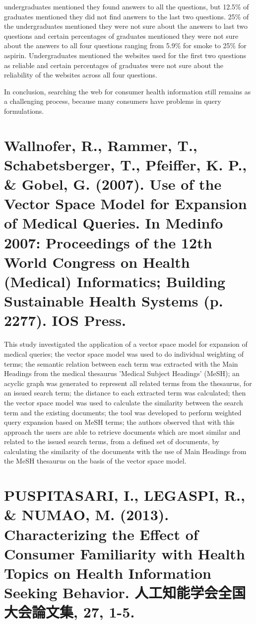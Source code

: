 \documentclass[]{article}
\begin{document}
undergraduates mentioned they found answers to all the questions, but 12.5\% of graduates mentioned they did not find answers to the last two questions. 25\% of the undergraduates mentioned they were not sure about the answers to last two questions and certain percentages of graduates mentioned they were not sure about the answers to all four questions ranging from 5.9\% for smoke to 25\% for aspirin. Undergraduates mentioned  the websites used for the first two questions as reliable and certain percentages of graduates were not sure about the reliability of the websites across all four questions.         

In conclusion, searching the web for consumer health information still remains as a challenging process, because many consumers have problems in query formulations. 

\section{Wallnofer, R., Rammer, T., Schabetsberger, T., Pfeiffer, K. P., \& Gobel, G. (2007). Use of the Vector Space Model for Expansion of Medical Queries. In Medinfo 2007: Proceedings of the 12th World Congress on Health (Medical) Informatics; Building Sustainable Health Systems (p. 2277). IOS Press.}

This study investigated the application of a vector space model for expansion of medical queries; the vector space model was used to do individual weighting of terms; the semantic relation between each term was extracted with the Main Headings from the medical thesaurus 'Medical Subject Headings' (MeSH); an acyclic graph was generated to represent all related terms from the thesaurus, for an issued search term; the distance to each extracted term was calculated; then the vector space model was used to calculate the similarity between the search term and the existing documents; the tool was developed to perform weighted query expansion based on MeSH terms; the authors observed that with this approach the users are able to retrieve documents which are most similar and related to the issued search terms, from a defined set of documents, by calculating the similarity of the documents with the use of Main Headings from the MeSH thesaurus on the basis of the vector space model.    

\section{PUSPITASARI, I., LEGASPI, R., \& NUMAO, M. (2013). Characterizing the Effect of Consumer Familiarity with Health Topics on Health Information Seeking Behavior. 人工知能学会全国大会論文集, 27, 1-5.}
\end{document}
